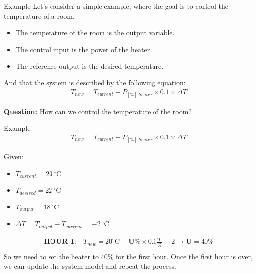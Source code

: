 \documentclass[aspectratio=169,hyperref={pdfpagelabels=false}]{beamer}
\begin{document}
\begin{frame}{Example}
  Let's consider a simple example, where the goal is to control the temperature of a room.
  \begin{itemize}
      \item The temperature of the room is the output variable.
      \item The control input is the power of the heater.
      \item The reference output is the desired temperature.
  \end{itemize}
  And that the system is described by the following equation:
  \begin{align*}
    T_{new} = T_{current} + P_{[\%]\: heater}\times 0.1 \times \Delta  T
  \end{align*}\pause
  \begin{block}{}
    \textbf{Question:} How can we control the temperature of the room?
  \end{block}
  \end{frame}

  \begin{frame}{Example}
    \begin{align*}
      T_{new} = T_{current} + P_{[\%]\: heater}\times 0.1 \times \Delta  T
    \end{align*}

    Given:
    \begin{itemize}
        \item $T_{current} = 20 \: ^{\circ} \text{C}$
        \item $T_{desired} = 22 \: ^{\circ} \text{C}$
        \item $T_{output} = 18 \: ^{\circ} \text{C}$
        \item $\Delta T = T_{output} - T_{current} =  -2 \: ^{\circ} \text{C}$
    \end{itemize}
    \begin{align*}
    \textbf{HOUR 1:} \quad T_{new} = 20 ^{\circ} \text{C} + \textbf{U}\% \times 0.1 \frac{^{\circ} \text{C}}{{\%}} - 2 \longrightarrow \textbf{U} = 40 \% \\
    \end{align*}
So we need to set the heater to 40\% for the first hour. Once the first hour is over, we can update the system model and repeat the process.
\end{frame}
 
\end{document}
